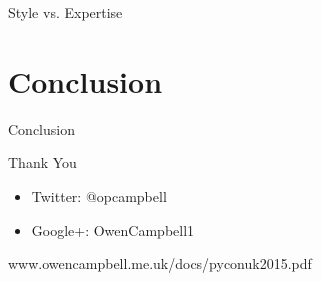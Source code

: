 \documentclass[14pt]{beamer}
\begin{document}
    \begin{frame}{Style vs. Expertise}
      
    \end{frame}

  \section{Conclusion}

    \begin{frame}{Conclusion}
    \end{frame}

    \begin{frame}{Thank You}
      \begin{itemize}
        \item Twitter: @opcampbell
        \item Google+: OwenCampbell1
      \end{itemize}
      www.owencampbell.me.uk/docs/pyconuk2015.pdf
    \end{frame}
\end{document}
